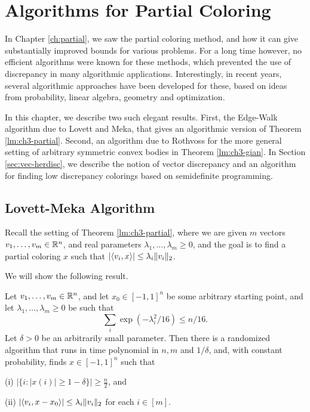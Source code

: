 
\chapter{Algorithms for Partial Coloring}
\label{ch:partial-alg}
In Chapter \ref{ch:partial}, we saw the partial coloring method, and how it can give substantially improved bounds for various problems.
For a long time however, no efficient algorithms were known for these methods, which prevented the use of discrepancy in many algorithmic applications. Interestingly, in recent years, several algorithmic approaches have been developed for these, based on ideas from probability, linear algebra, geometry and optimization.

In this chapter, we describe two such elegant results. First, the Edge-Walk algorithm due to Lovett and Meka, that gives an algorithmic version of Theorem \ref{lm:ch3-partial}. Second, an algorithm due to Rothvoss for the more general setting of arbitrary symmetric convex bodies in Theorem \ref{lm:ch3-gian}.
In Section \ref{sec:vec-herdisc}, we describe the notion of vector discrepancy and an algorithm for finding low discrepancy colorings based on semidefinite programming.





\section{Lovett-Meka Algorithm}
\label{sec:lm}
Recall the setting of Theorem \ref{lm:ch3-partial}, where we are given $m$ vectors $v_1, \ldots, v_m \in \mathbb{R}^n$, and real parameters $\lambda_1,\ldots, \lambda_m\geq 0$, and the goal is to find a partial coloring $x$ such that $ |\langle v_i,x\rangle| \leq \lambda_i \|v_i\|_2 $. 

We will show the following result.


\begin{theorem}
\label{th:lm}
Let $v_1, \ldots, v_m \in \mathbb{R}^n$,  and let $x_0 \in [-1,1]^n$ be some arbitrary starting point, and let   $\lambda_1,\ldots,\lambda_m \geq 0$ be such that 
\begin{equation}
\label{eqcond21}
 \sum_i \exp(-\lambda_i^2/16) \leq n/16.
 \end{equation}
 Let $\delta>0$ be an arbitrarily small parameter.
Then there is a randomized algorithm that runs in time polynomial in $n,m$ and $1/\delta$, and,  with constant probability, finds $x\in [-1,1]^n$ such that
\smallskip 

(i) $|\{i: |x(i)| \geq 1-\delta\}| \ge \frac{n}{2}$, and 

\smallskip

(ii)  $|\langle v_i,x-x_0\rangle| \leq \lambda_i \|v_i\|_2$ for each $i\in [m]$.
\end{theorem}


